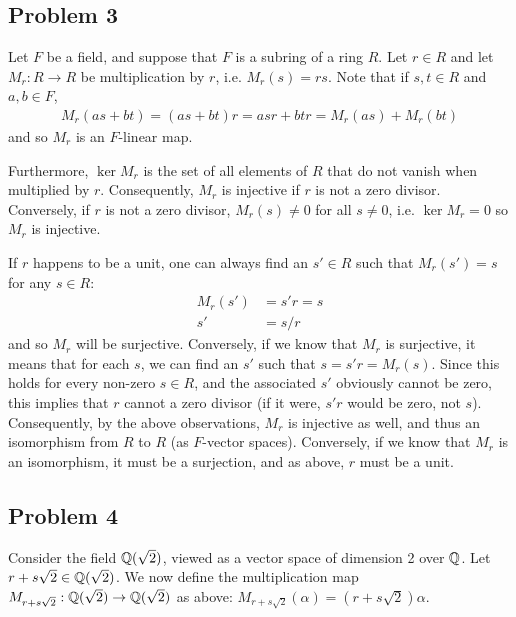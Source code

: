 \documentclass{../../mathnotes}
\begin{document}
\subsection*{Problem 3}

Let $F$ be a field, and suppose that $F$ is a subring of a ring $R$. Let $r\in R$ and let $M_r:R\to R$ be multiplication
by $r$, i.e. $M_r(s)=rs$. Note that if $s,t\in R$ and $a,b\in F$,
\begin{align*}
    M_r(as+bt)=(as+bt)r=asr+btr=M_r(as)+M_r(bt)
\end{align*}
and so $M_r$ is an $F$-linear map.

Furthermore, $\ker M_r$ is the set of all elements of $R$ that do not vanish when multiplied by $r$. Consequently, $M_r$ is injective
if $r$ is not a zero divisor. Conversely, if $r$ is not a zero divisor, $M_r(s)\neq0$ for all $s\neq0$, i.e. $\ker M_r=0$ so
$M_r$ is injective.

If $r$ happens to be a unit, one can always find an $s'\in R$ such that $M_r(s')=s$ for any $s\in R$:
\begin{align*}
    M_r(s')&=s'r=s\\
    s'&=s/r
\end{align*}
and so $M_r$ will be surjective. Conversely, if we know that $M_r$ is surjective, it means that for each $s$, we can find an $s'$
such that $s=s'r=M_r(s)$. Since this holds for every non-zero $s\in R$, and the associated $s'$ obviously cannot be zero, this implies that
$r$ cannot a zero divisor (if it were, $s'r$ would be zero, not $s$). Consequently, by the above observations, $M_r$ is injective as well,
and thus an isomorphism from $R$ to $R$ (as $F$-vector spaces). Conversely, if we know that $M_r$ is an isomorphism, it must be a surjection,
and as above, $r$ must be a unit. 

\subsection*{Problem 4}

Consider the field $\mathbb{Q}(\sqrt{2})$, viewed as a vector space of dimension 2 over $\mathbb{Q}$. Let $r+s\sqrt{2}\in\mathbb{Q}(\sqrt{2})$.
We now define the multiplication map $M_{r+s\sqrt{2}}:\mathbb{Q}(\sqrt{2})\to\mathbb{Q}(\sqrt{2})$ as above: $M_{r+s\sqrt{2}}(\alpha)=(r+s\sqrt{2})\alpha$.
\end{document}
